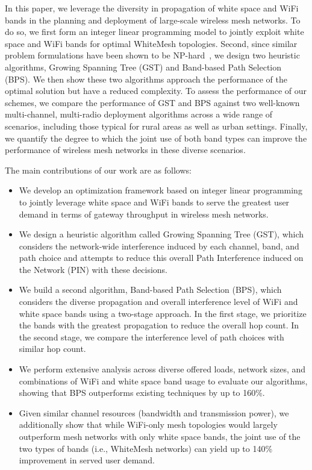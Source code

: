 In this paper, we leverage the diversity in propagation of
white space and WiFi bands in the planning and deployment
of large-scale wireless mesh networks. To do so, we first form an
integer linear programming model to jointly exploit 
white space and WiFi bands for optimal WhiteMesh topologies.
Second, since similar problem formulations have been shown to be 
NP-hard~\cite{jain2005impact}, we design two heuristic algorithms, 
Growing Spanning Tree (GST) and Band-based Path Selection (BPS). We then
show these two algorithms approach the performance of the 
optimal solution but have a reduced complexity. To assess the 
performance of our schemes, we compare the performance of GST and 
BPS against two well-known multi-channel, multi-radio deployment 
algorithms across a wide range of scenarios, including those
typical for rural areas as well as urban settings. Finally, we
quantify the degree to which the joint use of both band types can improve the 
performance of wireless mesh networks in these diverse scenarios.

The main contributions of our work are as follows:
\begin{itemize}
\item We develop an optimization framework based on integer
linear programming to jointly leverage white space and WiFi bands
to serve the greatest user demand in terms of gateway throughput 
in wireless mesh networks.  
\item We design a heuristic algorithm called Growing Spanning Tree (GST), which considers the network-wide interference induced by each channel, band, and path choice and attempts to reduce this overall Path Interference induced on the Network (PIN) with these decisions.
\item We build a second algorithm, Band-based Path 
Selection (BPS), which considers the diverse propagation 
and overall interference level of WiFi and white space bands using
a two-stage approach.  In the first stage, we prioritize the bands
with the greatest propagation to reduce the overall hop count. In the
second stage, we compare the interference level of path choices with
similar hop count. 
\item We perform extensive analysis across diverse offered loads,
network sizes, and combinations of WiFi and white space band usage
to evaluate our algorithms, showing that BPS outperforms existing
techniques by up to 160\%.  
\item Given similar channel resources
(bandwidth and transmission power), we additionally show that while
WiFi-only mesh topologies would largely outperform mesh networks with only
white space bands, the joint use of the two types of bands (i.e., WhiteMesh 
networks) can yield up to 140\% improvement in served user demand.
\end{itemize}

